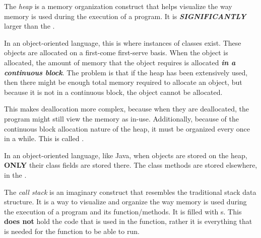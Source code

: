 \begin{definition}[Heap]\label{def:Heap}
  The \emph{heap} is a memory organization construct that helps visualize the way memory is used during the execution of a program.
  It is \textbf{\emph{SIGNIFICANTLY}} larger than the .

  In an object-oriented language, this is where instances of classes exist.
  These objects are allocated on a first-come first-serve basis.
  When the object is allocated, the amount of memory that the object requires is allocated \textbf{\emph{in a continuous block}}.
  The problem is that if the heap has been extensively used, then there might be enough total memory required to allocate an object, but because it is not in a continuous block, the object cannot be allocated.

  This makes deallocation more complex, because when they are deallocated, the program might still view the memory as in-use.
  Additionally, because of the continuous block allocation nature of the heap, it must be organized every once in a while.
  This is called .

  \begin{remark}
    In an object-oriented language, like Java, when objects are stored on the heap, \textbf{ONLY} their class fields are stored there.
    The class methods are stored elsewhere, in the .
  \end{remark}
\end{definition}

\begin{definition}\label{def:Call_Stack}
  The \emph{call stack} is an imaginary construct that resembles the traditional stack data structure.
  It is a way to visualize and organize the way memory is used during the execution of a program and its function/methods.
  It is filled with s.
  This \textbf{does not} hold the code that is used in the function, rather it is everything that is needed for the function to be able to run.
\end{definition}

